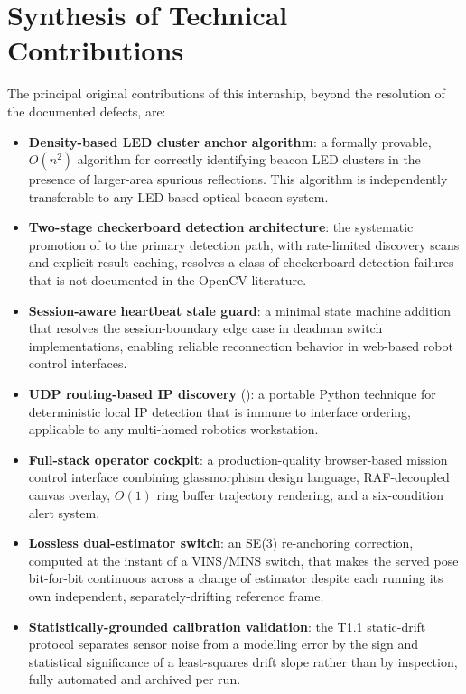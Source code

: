 \section{Synthesis of Technical Contributions}

The principal original contributions of this internship, beyond the resolution of the documented defects, are:

\begin{itemize}[leftmargin=1.4em]
  \item \textbf{Density-based LED cluster anchor algorithm}: a formally provable, $O(n^2)$ algorithm for correctly identifying beacon LED clusters in the presence of larger-area spurious reflections. This algorithm is independently transferable to any LED-based optical beacon system.
  \item \textbf{Two-stage checkerboard detection architecture}: the systematic promotion of  to the primary detection path, with rate-limited discovery scans and explicit result caching, resolves a class of checkerboard detection failures that is not documented in the OpenCV literature.
  \item \textbf{Session-aware heartbeat stale guard}: a minimal state machine addition that resolves the session-boundary edge case in deadman switch implementations, enabling reliable reconnection behavior in web-based robot control interfaces.
  \item \textbf{UDP routing-based IP discovery} (): a portable Python technique for deterministic local IP detection that is immune to interface ordering, applicable to any multi-homed robotics workstation.
  \item \textbf{Full-stack operator cockpit}: a production-quality browser-based mission control interface combining glassmorphism design language, RAF-decoupled canvas overlay, $O(1)$ ring buffer trajectory rendering, and a six-condition alert system.
  \item \textbf{Lossless dual-estimator switch}: an SE(3) re-anchoring correction, computed at the instant of a VINS/MINS switch, that makes the served pose bit-for-bit continuous across a change of estimator despite each running its own independent, separately-drifting reference frame.
  \item \textbf{Statistically-grounded calibration validation}: the T1.1 static-drift protocol separates sensor noise from a modelling error by the sign and statistical significance of a least-squares drift slope rather than by inspection, fully automated and archived per run.

\end{itemize}
